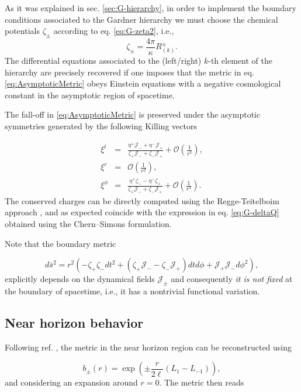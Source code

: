 \documentclass[letterpaper,11pt,oneside]{book}
\begin{document}
As it was explained in sec. \ref{sec:G-hierarchy}, in order to implement
the boundary conditions associated to the Gardner hierarchy we must
choose the chemical potentials $\zeta_{\pm}$ according to eq. \eqref{eq:G-zeta2},
i.e.,
\[
\zeta_{\pm}=\frac{4\pi}{\kappa}R_{\left(k\right)}^{\pm}.
\]
The differential equations associated to the (left/right) $k$-th
element of the hierarchy are precisely recovered if one imposes that
the metric in eq. \eqref{eq:AsymptoticMetric} obeys Einstein equations
with a negative cosmological constant in the asymptotic region of
spacetime.

The fall-off in \eqref{eq:AsymptoticMetric} is preserved under the
asymptotic symmetries generated by the following Killing vectors

\begin{eqnarray}
	\xi^{t} & = & \frac{\eta^{+}\mathcal{J}_{-}+\eta^{-}\mathcal{J}_{+}}{\zeta_{+}\mathcal{J}_{-}+\zeta_{-}\mathcal{J}_{+}}+\mathcal{O}\left(\frac{1}{r^{3}}\right),\nonumber \\
	\xi^{r} & = & \mathcal{O}\left(\frac{1}{r^{2}}\right),\\
	\xi^{\phi} & = & \frac{\eta^{+}\zeta_{-}-\eta^{-}\zeta_{+}}{\zeta_{+}\mathcal{J}_{-}+\zeta_{-}\mathcal{J}_{+}}+\mathcal{O}\left(\frac{1}{r^{3}}\right).\nonumber 
\end{eqnarray}
The conserved charges can be directly computed using the Regge-Teitelboim
approach \cite{Regge:1974zd}, and as expected coincide with the expression
in eq. \eqref{eq:G-deltaQ} obtained using the Chern--Simons formulation.

Note that the boundary metric

\[
d\bar{s}^{2}=r^{2}\left(-\zeta_{+}\zeta_{-}dt^{2}+\left(\zeta_{+}\mathcal{J}_{-}-\zeta_{-}\mathcal{J}_{+}\right)dtd\phi+\mathcal{J_{+}}\mathcal{J_{-}}d\phi^{2}\right),
\]
explicitly depends on the dynamical fields $\mathcal{J_{\pm}}$ and
consequently \emph{it is not fixed} at the boundary of spacetime,
i.e., it has a nontrivial functional variation.

\subsection{Near horizon behavior}

Following ref. \cite{Afshar:2016kjj}, the metric in the near horizon
region can be reconstructed using

\[
b_{\pm}\left(r\right)=\exp\left(\pm\frac{r}{2\ell}\left(L_{1}-L_{-1}\right)\right),
\]
and considering an expansion around $r=0$. The metric then reads
\end{document}
